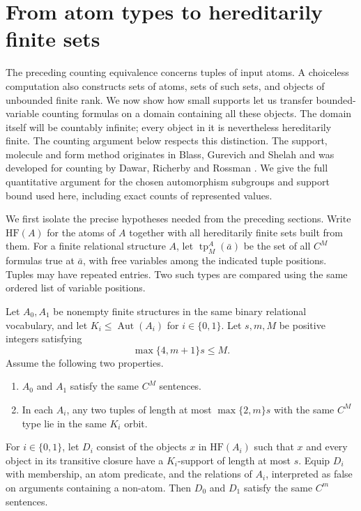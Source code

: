 \section{From atom types to hereditarily finite sets}
\label{sec:hf-transfer}

The preceding counting equivalence concerns tuples of input atoms.  A
choiceless computation also constructs sets of atoms, sets of such sets, and
objects of unbounded finite rank.  We now show how small supports let us
transfer bounded-variable counting formulas on a domain containing all these
objects.  The domain itself will be countably infinite; every object in it
is nevertheless hereditarily finite.  The counting argument below respects
this distinction. The support, molecule and form method originates in
Blass, Gurevich and Shelah
\cite[Sections~8--9 of the published version]{bgs1999} and was developed
for counting by Dawar, Richerby and Rossman
\cite[Section~8 of the author version]{drr2008}. We give the full
quantitative argument for the chosen automorphism subgroups and support
bound used here, including exact counts of represented values.

We first isolate the precise hypotheses needed from the preceding sections.
Write $\mathrm{HF}(A)$ for the atoms of $A$ together with all
hereditarily finite sets built from them.
For a finite relational structure $A$, let $\operatorname{tp}_M^A(\bar a)$
be the set of all $C^M$ formulas true at $\bar a$, with free variables among
the indicated tuple positions.  Tuples may have repeated entries.  Two
such types are compared using the same ordered list of variable positions.

\begin{theorem}
\label{thm:hf-transfer}
Let $A_0,A_1$ be nonempty finite structures in the same binary relational
vocabulary, and let $K_i\leq\operatorname{Aut}(A_i)$ for $i\in\{0,1\}$.
Let $s,m,M$ be positive integers satisfying
\[
 \max\{4,m+1\}s\leq M.
\]
Assume the following two properties.
\begin{enumerate}
\item $A_0$ and $A_1$ satisfy the same $C^M$ sentences.
\item In each $A_i$, any two tuples of length at most
      $\max\{2,m\}s$ with the same $C^M$ type lie in the same $K_i$ orbit.
\end{enumerate}
For $i\in\{0,1\}$, let $D_i$ consist of the objects $x$ in
$\mathrm{HF}(A_i)$ such that $x$ and every object in its transitive closure
have a $K_i$-support of length at most $s$.  Equip $D_i$ with membership,
an atom predicate, and the relations of $A_i$, interpreted as false on
arguments containing a non-atom.  Then $D_0$ and $D_1$ satisfy the same
$C^m$ sentences.
\end{theorem}

